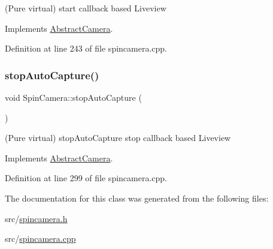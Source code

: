(Pure virtual) start callback based Liveview 



Implements \mbox{\hyperlink{class_abstract_camera_a2f47d9877c5308856f42c94723faca33}{Abstract\+Camera}}.



Definition at line 243 of file spincamera.\+cpp.

\mbox{\label{class_spin_camera_a161f8d383c56161a8e7731d7299504db}} 
\subsubsection{\texorpdfstring{stopAutoCapture()}{stopAutoCapture()}}
{\footnotesize\ttfamily void Spin\+Camera\+::stop\+Auto\+Capture (\begin{DoxyParamCaption}{ }\end{DoxyParamCaption})\hspace{0.3cm}{\ttfamily [virtual]}}



(Pure virtual) stop\+Auto\+Capture stop callback based Liveview 



Implements \mbox{\hyperlink{class_abstract_camera_a08bd5e2c3f8a92187f36e1f6322eccb5}{Abstract\+Camera}}.



Definition at line 299 of file spincamera.\+cpp.



The documentation for this class was generated from the following files\+:\begin{DoxyCompactItemize}
\item 
src/\mbox{\hyperlink{spincamera_8h}{spincamera.\+h}}\item 
src/\mbox{\hyperlink{spincamera_8cpp}{spincamera.\+cpp}}\end{DoxyCompactItemize}
